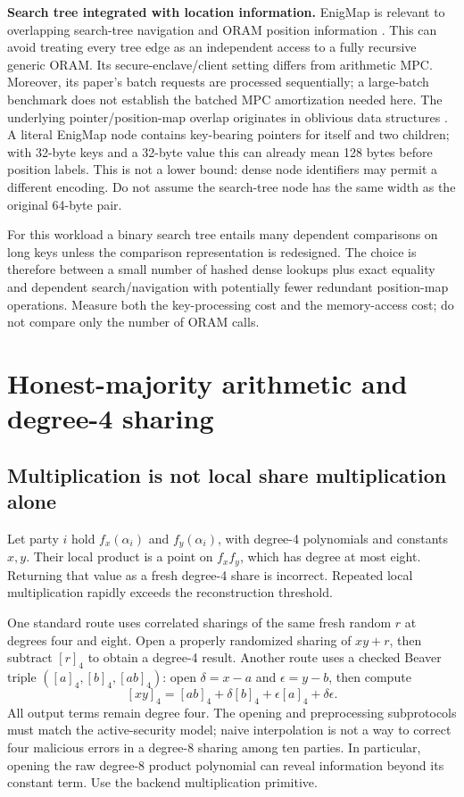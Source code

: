 \documentclass[11pt]{article}
\newcommand{\sh}[1]{\left[#1\right]_4}
\begin{document}
\textbf{Search tree integrated with location information.} EnigMap is relevant
to overlapping search-tree navigation and ORAM position information
\cite{enigmap}. This can avoid treating every tree edge as an independent access
to a fully recursive generic ORAM. Its secure-enclave/client setting differs
from arithmetic MPC. Moreover, its paper's batch requests are processed
sequentially; a large-batch benchmark does not establish the batched MPC
amortization needed here.
The underlying pointer/position-map overlap originates in oblivious data
structures \cite{ods2014}. A literal EnigMap node contains key-bearing pointers
for itself and two children; with 32-byte keys and a 32-byte value this can
already mean 128 bytes before position labels. This is not a lower bound: dense
node identifiers may permit a different encoding. Do not assume the search-tree
node has the same width as the original 64-byte pair.

For this workload a binary search tree entails many dependent comparisons on
long keys unless the comparison representation is redesigned. The choice is
therefore between a small number of hashed dense lookups plus exact equality
and dependent search/navigation with potentially fewer redundant position-map
operations. Measure both the key-processing cost and the memory-access cost;
do not compare only the number of ORAM calls.

\section{Honest-majority arithmetic and degree-4 sharing}\label{sec:backend}

\subsection{Multiplication is not local share multiplication alone}

Let party $i$ hold $f_x(\alpha_i)$ and $f_y(\alpha_i)$, with degree-4 polynomials
and constants $x,y$. Their local product is a point on $f_xf_y$, which has degree
at most eight. Returning that value as a fresh degree-4 share is incorrect.
Repeated local multiplication rapidly exceeds the reconstruction threshold.

One standard route uses correlated sharings of the same fresh random $r$ at
degrees four and eight. Open a properly randomized sharing of $xy+r$, then
subtract $[r]_4$ to obtain a degree-4 result. Another route uses a checked Beaver
triple $(\sh a,\sh b,\sh{ab})$: open
$\delta=x-a$ and $\epsilon=y-b$, then compute
\begin{equation}
\sh{xy}=\sh{ab}+\delta\sh b+\epsilon\sh a+\delta\epsilon.
\label{eq:beaver}
\end{equation}
All output terms remain degree four. The opening and preprocessing subprotocols
must match the active-security model; naive interpolation is not a way to
correct four malicious errors in a degree-8 sharing among ten parties.
In particular, opening the raw degree-8 product polynomial can reveal information
beyond its constant term. Use the backend multiplication primitive.
\end{document}

